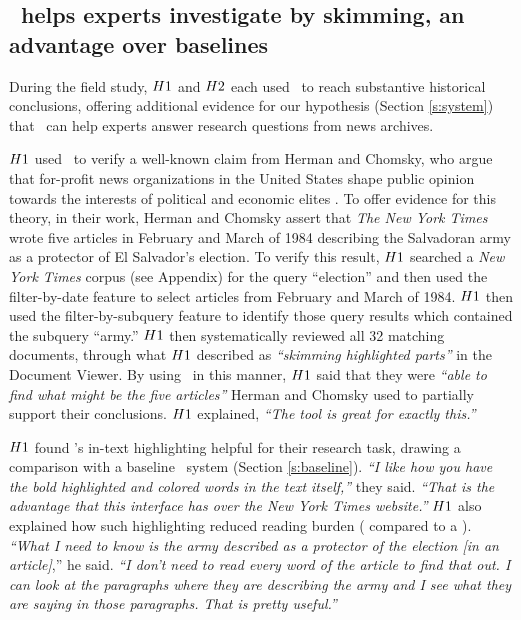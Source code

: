 \subsection{\ours~helps experts investigate by {skimming}, an advantage over baselines}

During the field study, $H1$ and $H2$ each used \ours~to reach substantive historical conclusions, offering additional evidence for our hypothesis (Section \ref{s:system}) that \ours~can help experts answer research questions from news archives.

${H1}$ used \ours~to verify a well-known claim from Herman and Chomsky, who argue that for-profit news organizations in the United States shape public opinion towards the interests of political and economic elites \cite{MC}.
To offer evidence for this theory, in their work, Herman and Chomsky assert that \textit{The New York Times} wrote five articles in February and March of 1984 describing the Salvadoran army as a protector of El Salvador's election. To verify this result, $H1$ searched a \textit{New York Times} corpus (see Appendix) for the query ``{election}'' and then used the filter-by-date feature to select articles from February and March of 1984. $H1$ then used the filter-by-subquery feature to identify those query results which contained the subquery ``{army}.'' 
$H1$ then systematically reviewed all 32 matching documents, through what  $H1$  described as \textit{``skimming highlighted parts''} in the Document Viewer. By using \ours~in this manner, $H1$ said that they were \textit{``able to find what might be the five articles''} Herman and Chomsky used to partially support their conclusions. $H1$ explained, \textit{``The tool is great for exactly this.''}

$H1$ found \ours's in-text highlighting helpful for their research task, drawing a comparison with a baseline \Baselongname~system (Section \ref{s:baseline}).
\textit{``I like how you have the bold highlighted and colored words in the text itself,''} they said.  \textit{``That is the advantage that this interface has over the New York Times website.''}
$H1$ also explained how such highlighting reduced reading burden ( compared to a \Baselongname). 
\textit{``What I need to know is the army described as a protector of the election [in an article]},'' he said.
\textit{``I don't need to read every word of the article to find that out. I can look at the paragraphs where they are describing the army and I see what they are saying in those paragraphs. That is pretty useful.''}

